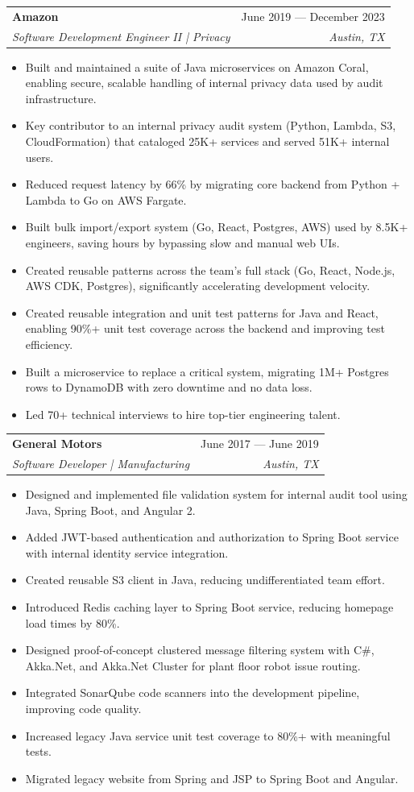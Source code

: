 \documentclass[letterpaper,11pt]{article}
\makeatletter
\newcommand{\resumeItem}[1]{
  \item\small{
    {#1 \vspace{-2pt}}
  }
}
\newcommand{\resumeSubheading}[4]{
  \vspace{-2pt}\item
    \begin{tabular*}{0.97\textwidth}[t]{l@{\extracolsep{\fill}}r}
      \textbf{#1} & #2 \\
      \textit{\small#3} & \textit{\small #4} \\
    \end{tabular*}\vspace{-7pt}
}
\newcommand{\resumeSubSubheading}[2]{
    \item
    \begin{tabular*}{0.97\textwidth}{l@{\extracolsep{\fill}}r}
      \textit{\small#1} & \textit{\small #2} \\
    \end{tabular*}\vspace{-7pt}
}
\newcommand{\resumeSubHeadingListEnd}{\end{itemize}}
\newcommand{\resumeItemListStart}{\begin{itemize}}
\newcommand{\resumeItemListEnd}{\end{itemize}\vspace{-5pt}}
\makeatother
\begin{document}
    \resumeSubheading{Amazon}{June 2019 --- December 2023}{Software Development Engineer II | Privacy}{Austin, TX}
      \resumeItemListStart{}
      \resumeItem{Built and maintained a suite of Java microservices on Amazon Coral, enabling secure, scalable handling of internal privacy data used by audit infrastructure.}
      \resumeItem{Key contributor to an internal privacy audit system (Python, Lambda, S3, CloudFormation) that cataloged 25K+ services and served 51K+ internal users.}
      \resumeItem{Reduced request latency by 66\% by migrating core backend from Python + Lambda to Go on AWS Fargate.}
      \resumeItem{Built bulk import/export system (Go, React, Postgres, AWS) used by 8.5K+ engineers, saving hours by bypassing slow and manual web UIs.}
      \resumeItem{Created reusable patterns across the team’s full stack (Go, React, Node.js, AWS CDK, Postgres), significantly accelerating development velocity.}
      \resumeItem{Created reusable integration and unit test patterns for Java and React, enabling 90\%+ unit test coverage across the backend and improving test efficiency.}
      \resumeItem{Built a microservice to replace a critical system, migrating 1M+ Postgres rows to DynamoDB with zero downtime and no data loss.}
      \resumeItem{Led 70+ technical interviews to hire top-tier engineering talent.}
      \resumeItemListEnd{}
      

    \resumeSubheading{General Motors}{June 2017 --- June 2019}{Software Developer | Manufacturing}{Austin, TX}
      \resumeItemListStart{}
      \resumeItem{Designed and implemented file validation system for internal audit tool using Java, Spring Boot, and Angular 2.}
      \resumeItem{Added JWT-based authentication and authorization to Spring Boot service with internal identity service integration.}
      \resumeItem{Created reusable S3 client in Java, reducing undifferentiated team effort.}
      \resumeItem{Introduced Redis caching layer to Spring Boot service, reducing homepage load times by 80\%.}
      \resumeItem{Designed proof-of-concept clustered message filtering system with C\#, Akka.Net, and Akka.Net Cluster for plant floor robot issue routing.}
      \resumeItem{Integrated SonarQube code scanners into the development pipeline, improving code quality.}
      \resumeItem{Increased legacy Java service unit test coverage to 80\%+ with meaningful tests.}
      \resumeItem{Migrated legacy website from Spring and JSP to Spring Boot and Angular.}
    \resumeItemListEnd{}
\end{document}
